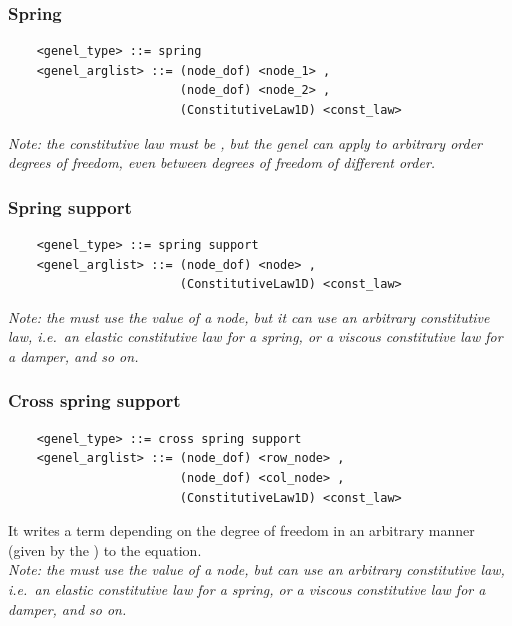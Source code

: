 \subsubsection{Spring}
\begin{verbatim}
    <genel_type> ::= spring
    <genel_arglist> ::= (node_dof) <node_1> ,
                        (node_dof) <node_2> ,
                        (ConstitutiveLaw1D) <const_law>
\end{verbatim}
{\em 
    Note: the constitutive law must be , but the 
    genel can apply to arbitrary order degrees of freedom, even between degrees 
    of freedom of different order.
}

\subsubsection{Spring support}
\begin{verbatim}
    <genel_type> ::= spring support
    <genel_arglist> ::= (node_dof) <node> ,                      
                        (ConstitutiveLaw1D) <const_law>
\end{verbatim}
{\em
    Note: the  must use the  value of a 
     node, but it can use an arbitrary constitutive law,
    i.e.\ an elastic constitutive law for a spring, or a viscous
    constitutive law for a damper, and so on.
}

\subsubsection{Cross spring support}
\begin{verbatim}
    <genel_type> ::= cross spring support
    <genel_arglist> ::= (node_dof) <row_node> ,                      
                        (node_dof) <col_node> ,                      
                        (ConstitutiveLaw1D) <const_law>
\end{verbatim}
It writes a term depending on the  degree of freedom in an
arbitrary manner (given by the ) to the 
 equation. \\
{\em
    Note: the  must use the  value
    of a  node, but can use an arbitrary constitutive law,
    i.e.\ an elastic constitutive law for a spring, or a viscous
    constitutive law for a damper, and so on.
}

